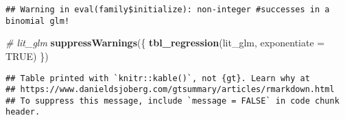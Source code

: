 \documentclass[
]{article}
\newenvironment{Shaded}{\begin{snugshade}}{\end{snugshade}}
\newcommand{\AttributeTok}[1]{\textcolor[rgb]{0.13,0.29,0.53}{#1}}
\newcommand{\CommentTok}[1]{\textcolor[rgb]{0.56,0.35,0.01}{\textit{#1}}}
\newcommand{\ConstantTok}[1]{\textcolor[rgb]{0.56,0.35,0.01}{#1}}
\newcommand{\FunctionTok}[1]{\textcolor[rgb]{0.13,0.29,0.53}{\textbf{#1}}}
\newcommand{\NormalTok}[1]{#1}
\begin{document}
\begin{verbatim}
## Warning in eval(family$initialize): non-integer #successes in a binomial glm!
\end{verbatim}

\begin{Shaded}
\begin{Highlighting}[]
\CommentTok{\# lit\_glm}
\FunctionTok{suppressWarnings}\NormalTok{(\{}
  \FunctionTok{tbl\_regression}\NormalTok{(lit\_glm, }\AttributeTok{exponentiate =} \ConstantTok{TRUE}\NormalTok{)}
\NormalTok{\})}
\end{Highlighting}
\end{Shaded}

\begin{verbatim}
## Table printed with `knitr::kable()`, not {gt}. Learn why at
## https://www.danieldsjoberg.com/gtsummary/articles/rmarkdown.html
## To suppress this message, include `message = FALSE` in code chunk header.
\end{verbatim}
\end{document}
